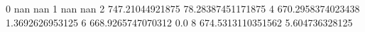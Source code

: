0 nan nan
1 nan nan
2 747.21044921875 78.28387451171875
4 670.2958374023438 1.3692626953125
6 668.9265747070312 0.0
8 674.5313110351562 5.604736328125
